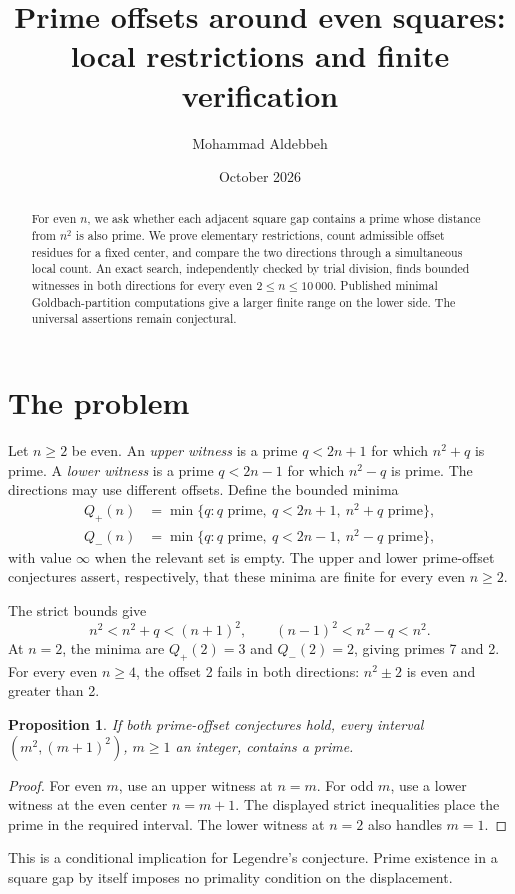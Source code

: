 \documentclass[11pt,a4paper]{article}
\title{Prime offsets around even squares:\\local restrictions and finite verification}
\author{Mohammad Aldebbeh}
\date{October 2026}
\newtheorem{proposition}{Proposition}
\newcommand{\Qp}{Q_{+}}
\newcommand{\Qm}{Q_{-}}
\begin{document}
\maketitle
\begin{abstract}
For even $n$, we ask whether each adjacent square gap contains a prime
whose distance from $n^2$ is also prime. We prove elementary restrictions,
count admissible offset residues for a fixed center, and compare the two
directions through a simultaneous local count. An exact search, independently
checked by trial division, finds bounded witnesses in both directions for every
even $2\le n\le10\,000$. Published minimal Goldbach-partition computations
give a larger finite range on the lower side. The universal assertions remain
conjectural.
\end{abstract}

\section{The problem}
Let $n\ge2$ be even. An \emph{upper witness} is a prime $q<2n+1$ for
which $n^2+q$ is prime. A \emph{lower witness} is a prime $q<2n-1$ for
which $n^2-q$ is prime. The directions may use different offsets.
Define the bounded minima
\begin{align*}
\Qp(n)&=\min\{q:q\text{ prime},\ q<2n+1,\ n^2+q\text{ prime}\},\\
\Qm(n)&=\min\{q:q\text{ prime},\ q<2n-1,\ n^2-q\text{ prime}\},
\end{align*}
with value $\infty$ when the relevant set is empty. The upper and lower
prime-offset conjectures assert, respectively, that these minima are finite
for every even $n\ge2$.

The strict bounds give
\[
 n^2<n^2+q<(n+1)^2,\qquad (n-1)^2<n^2-q<n^2.
\]
At $n=2$, the minima are $\Qp(2)=3$ and $\Qm(2)=2$, giving primes 7
and 2. For every even $n\ge4$, the offset 2 fails in both directions:
$n^2\pm2$ is even and greater than 2.

\begin{proposition}\label{prop:legendre}
If both prime-offset conjectures hold, every interval
$(m^2,(m+1)^2)$, $m\ge1$ an integer, contains a prime.
\end{proposition}
\begin{proof}
For even $m$, use an upper witness at $n=m$. For odd $m$, use a lower
witness at the even center $n=m+1$. The displayed strict inequalities
place the prime in the required interval. The lower witness at $n=2$
also handles $m=1$.
\end{proof}
This is a conditional implication for Legendre's conjecture. Prime existence
in a square gap by itself imposes no primality condition on the displacement.
\end{document}
